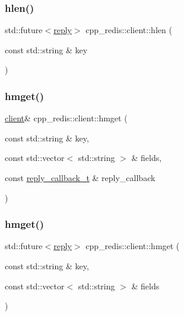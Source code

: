\mbox{\label{classcpp__redis_1_1client_a34b5783e7392f29dd26c6e114d535221}} 
\subsubsection{\texorpdfstring{hlen()}{hlen()}\hspace{0.1cm}{\footnotesize\ttfamily [2/2]}}
{\footnotesize\ttfamily std\+::future$<$\hyperlink{classcpp__redis_1_1reply}{reply}$>$ cpp\+\_\+redis\+::client\+::hlen (\begin{DoxyParamCaption}\item[{const std\+::string \&}]{key }\end{DoxyParamCaption})}

\mbox{\label{classcpp__redis_1_1client_aac28715b6b151dd96ddb760fcc490c3c}} 
\subsubsection{\texorpdfstring{hmget()}{hmget()}\hspace{0.1cm}{\footnotesize\ttfamily [1/2]}}
{\footnotesize\ttfamily \hyperlink{classcpp__redis_1_1client}{client}\& cpp\+\_\+redis\+::client\+::hmget (\begin{DoxyParamCaption}\item[{const std\+::string \&}]{key,  }\item[{const std\+::vector$<$ std\+::string $>$ \&}]{fields,  }\item[{const \hyperlink{classcpp__redis_1_1client_a061a1140d36d2eaeda82b09a0bb3f9f2}{reply\+\_\+callback\+\_\+t} \&}]{reply\+\_\+callback }\end{DoxyParamCaption})}

\mbox{\label{classcpp__redis_1_1client_a8e3af68988204e491ada35efaaf9b247}} 
\subsubsection{\texorpdfstring{hmget()}{hmget()}\hspace{0.1cm}{\footnotesize\ttfamily [2/2]}}
{\footnotesize\ttfamily std\+::future$<$\hyperlink{classcpp__redis_1_1reply}{reply}$>$ cpp\+\_\+redis\+::client\+::hmget (\begin{DoxyParamCaption}\item[{const std\+::string \&}]{key,  }\item[{const std\+::vector$<$ std\+::string $>$ \&}]{fields }\end{DoxyParamCaption})}

